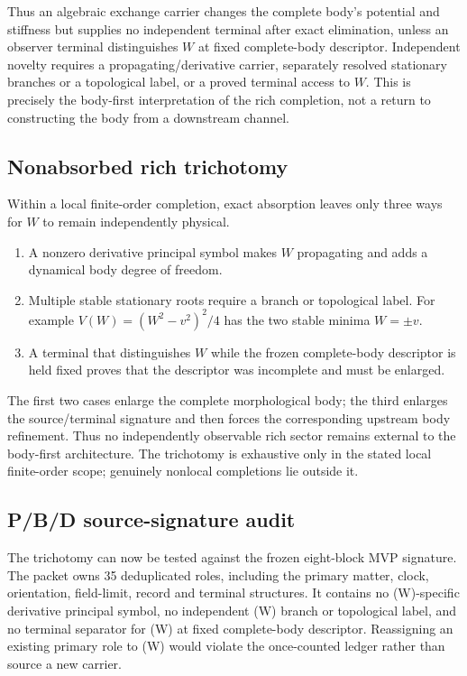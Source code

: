 \documentclass[11pt]{article}
\begin{document}
Thus an algebraic exchange carrier changes the complete body's potential and
stiffness but supplies no independent terminal after exact elimination, unless
an observer terminal distinguishes \(W\) at fixed complete-body descriptor.
Independent novelty requires a propagating/derivative carrier, separately
resolved stationary branches or a topological label, or a proved terminal
access to \(W\). This is precisely the body-first interpretation of the rich
completion, not a return to constructing the body from a downstream channel.

\subsection{Nonabsorbed rich trichotomy}

Within a local finite-order completion, exact absorption leaves only three
ways for \(W\) to remain independently physical.
\begin{enumerate}[label=\textbf{\Alph*.}]
 \item A nonzero derivative principal symbol makes \(W\) propagating and adds
 a dynamical body degree of freedom.
 \item Multiple stable stationary roots require a branch or topological label.
 For example \(V(W)=(W^2-v^2)^2/4\) has the two stable minima \(W=\pm v\).
 \item A terminal that distinguishes \(W\) while the frozen complete-body
 descriptor is held fixed proves that the descriptor was incomplete and must
 be enlarged.
\end{enumerate}
The first two cases enlarge the complete morphological body; the third enlarges
the source/terminal signature and then forces the corresponding upstream body
refinement. Thus no independently observable rich sector remains external to
the body-first architecture. The trichotomy is exhaustive only in the stated
local finite-order scope; genuinely nonlocal completions lie outside it.

\subsection{P/B/D source-signature audit}

The trichotomy can now be tested against the frozen eight-block MVP signature.
The packet owns 35 deduplicated roles, including the primary matter, clock,
orientation, field-limit, record and terminal structures. It contains no
(W)-specific derivative principal symbol, no independent (W) branch or
topological label, and no terminal separator for (W) at fixed complete-body
descriptor. Reassigning an existing primary role to (W) would violate the
once-counted ledger rather than source a new carrier.
\end{document}
